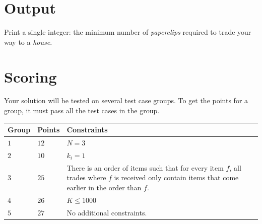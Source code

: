 \section*{Output}
Print a single integer: the minimum number of \emph{paperclips} required to trade your way to a \emph{house}.

\section*{Scoring}
Your solution will be tested on several test case groups. To get the points 
for a group, it must pass all the test cases in the group.

\noindent
\begin{tabular}{| l | l | p{12cm} |}
  \hline
  \textbf{Group} & \textbf{Points} & \textbf{Constraints} \\ \hline
  $1$ & $12$ & $N = 3$ \\ \hline
  $2$ & $10$ & $k_i = 1$ \\ \hline
  $3$ & $25$ & There is an order of items such that for every item
  $f$, all trades where $f$ is received only contain items that come earlier in the order than $f$. \\ \hline
  $4$ & $26$ & $K \leq 1000$ \\ \hline
  $5$ & $27$ & No additional constraints. \\ \hline
\end{tabular}
